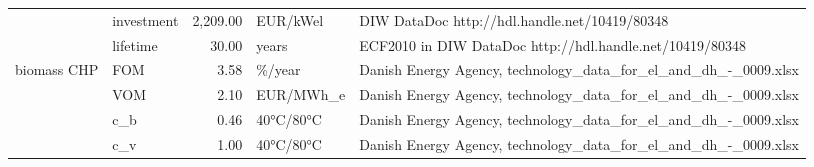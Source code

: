 \begin{longtable}{p{5cm}p{3cm}rp{3cm}p{11cm}}
                      & investment &       2,209.00 &                          EUR/kWel &                                                                                                                                                                                                                                                                                        DIW DataDoc http://hdl.handle.net/10419/80348 \\
                      & lifetime &          30.00 &                             years &                                                                                                                                                                                                                                                                             ECF2010 in DIW DataDoc http://hdl.handle.net/10419/80348 \\
biomass CHP & FOM &           3.58 &                            \%/year &                                                                                                                                                                                                                                                                      Danish Energy Agency, technology\_data\_for\_el\_and\_dh\_-\_0009.xlsx \\
                      & VOM &           2.10 &                         EUR/MWh\_e &                                                                                                                                                                                                                                                                      Danish Energy Agency, technology\_data\_for\_el\_and\_dh\_-\_0009.xlsx \\
                      & c\_b &           0.46 &                         40°C/80°C &                                                                                                                                                                                                                                                                      Danish Energy Agency, technology\_data\_for\_el\_and\_dh\_-\_0009.xlsx \\
                      & c\_v &           1.00 &                         40°C/80°C &                                                                                                                                                                                                                                                                      Danish Energy Agency, technology\_data\_for\_el\_and\_dh\_-\_0009.xlsx \\

\end{longtable}
